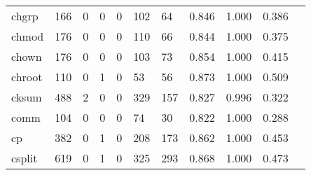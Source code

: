 \begin{longtable}{lp{1.10cm}p{1.10cm}p{1.10cm}p{1.10cm}p{1.10cm}p{1.10cm}p{1.10cm}p{1.10cm}p{1.10cm}p{1.10cm}}
chgrp     &                    166 &                                  0 &                                 0 &                                0 &                               102 &                              64 &                          0.846 &                                 1.000 &                               0.386 \\
chmod     &                    176 &                                  0 &                                 0 &                                0 &                               110 &                              66 &                          0.844 &                                 1.000 &                               0.375 \\
chown     &                    176 &                                  0 &                                 0 &                                0 &                               103 &                              73 &                          0.854 &                                 1.000 &                               0.415 \\
chroot    &                    110 &                                  0 &                                 1 &                                0 &                                53 &                              56 &                          0.873 &                                 1.000 &                               0.509 \\
cksum     &                    488 &                                  2 &                                 0 &                                0 &                               329 &                             157 &                          0.827 &                                 0.996 &                               0.322 \\
comm      &                    104 &                                  0 &                                 0 &                                0 &                                74 &                              30 &                          0.822 &                                 1.000 &                               0.288 \\
cp        &                    382 &                                  0 &                                 1 &                                0 &                               208 &                             173 &                          0.862 &                                 1.000 &                               0.453 \\
csplit    &                    619 &                                  0 &                                 1 &                                0 &                               325 &                             293 &                          0.868 &                                 1.000 &                               0.473 \\

\end{longtable}
